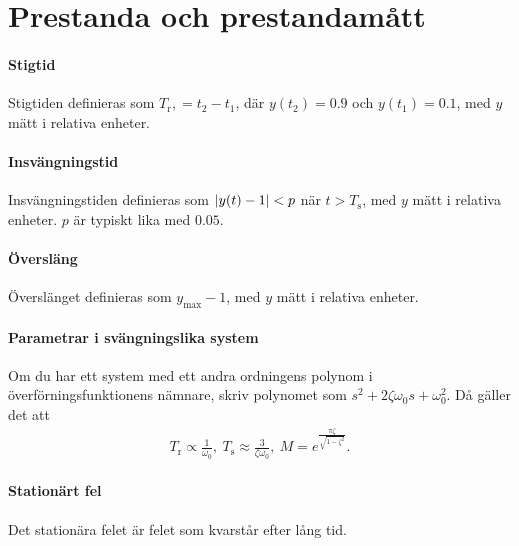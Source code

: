 \section{Prestanda och prestandamått}

\paragraph{Stigtid}
Stigtiden definieras som $T_{\text{r}}, = t_{2} - t_{1}$, där $y(t_{2}) = 0.9$ och $y(t_{1}) = 0.1$, med $y$ mätt i relativa enheter.

\paragraph{Insvängningstid}
Insvängningstiden definieras som $\abs{y(t) - 1} < p$ när $t > T_{\text{s}}$, med $y$ mätt i relativa enheter. $p$ är typiskt lika med $0.05$.

\paragraph{Översläng}
Överslänget definieras som $y_{\text{max}} - 1$, med $y$ mätt i relativa enheter.

\paragraph{Parametrar i svängningslika system}
Om du har ett system med ett andra ordningens polynom i överförningsfunktionens nämnare, skriv polynomet som $s^{2} + 2\zeta\omega_{0}s + \omega_{0}^{2}$. Då gäller det att
\begin{align*}
	T_{\text{r}} \propto \frac{1}{\omega_{0}},\ T_{\text{s}} \approx \frac{3}{\zeta\omega_{0}},\ M = e^{\frac{\pi\zeta}{\sqrt{1 - \zeta^{2}}}}.
\end{align*}

\paragraph{Stationärt fel}
Det stationära felet är felet som kvarstår efter lång tid.
